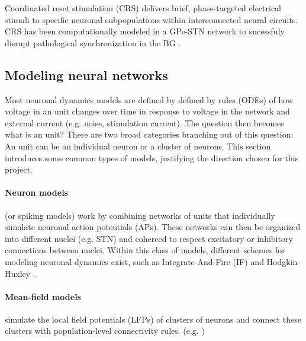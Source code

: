 Coordinated reset stimulation (CRS) delivers brief, phase-targeted electrical stimuli to specific
neuronal subpopulations within interconnected neural circuits.
CRS has been computationally modeled in a GPe-STN network to sucessfuly disrupt pathological
synchronization in the BG \cite{hauptmann2009cumulative, hauptmann2010restoration}.

\subsection{Modeling neural networks}
Most neuronal dynamics models are defined by defined by rules (ODEs) of how voltage in an unit changes
over time in response to voltage in the network and external current (e.g. noise, stimulation
current).
The question then becomes what is an unit? There are two broad categories branching out of this
question: An unit can be an individual neuron or a cluster of neurons. This section introduces
some common types of models, justifying the direction chosen for this project.

\paragraph{Neuron models} (or spiking models) work by combining networks of units that individually
simulate neuronal action potentials (APs).
These networks can then be organized into different nuclei (e.g. STN) and coherced to respect
excitatory or inhibitory connections between nuclei.
Within this class of models, different schemes for modeling neuronal dynamics exist,
such as Integrate-And-Fire (IF) \cite{gerstner2014if} and Hodgkin-Huxley
\cite{hodgkin1952measurement, gerstner2014hh}.

\paragraph{Mean-field models} simulate the local field potentials (LFPs) of clusters of neurons
and connect these clusters with population-level connectivity rules. (e.g.
\cite{jansen1995electroencephalogram, west2022stimulating})

